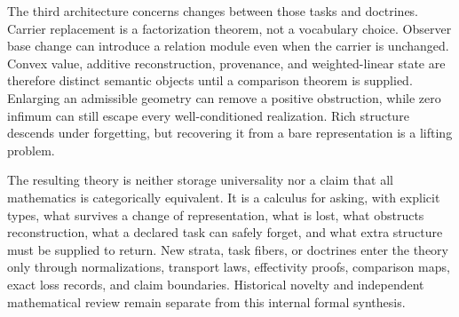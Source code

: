 The third architecture concerns changes between those tasks and doctrines.  Carrier replacement is a factorization theorem, not a vocabulary choice.  Observer base change can introduce a relation module even when the carrier is unchanged.  Convex value, additive reconstruction, provenance, and weighted-linear state are therefore distinct semantic objects until a comparison theorem is supplied.  Enlarging an admissible geometry can remove a positive obstruction, while zero infimum can still escape every well-conditioned realization.  Rich structure descends under forgetting, but recovering it from a bare representation is a lifting problem.

The resulting theory is neither storage universality nor a claim that all mathematics is categorically equivalent.  It is a calculus for asking, with explicit types, what survives a change of representation, what is lost, what obstructs reconstruction, what a declared task can safely forget, and what extra structure must be supplied to return.  New strata, task fibers, or doctrines enter the theory only through normalizations, transport laws, effectivity proofs, comparison maps, exact loss records, and claim boundaries.  Historical novelty and independent mathematical review remain separate from this internal formal synthesis.
